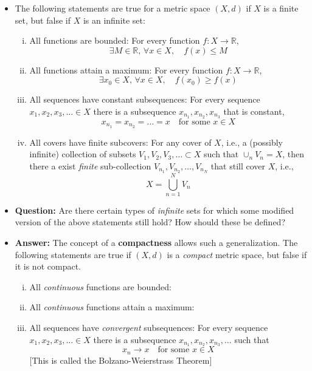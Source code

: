 \documentclass[11pt,twoside]{report}
\newcommand{\bbR}{{\mathbb{R}}}
\begin{document}
\begin{itemize}




\item The following statements are true for a metric space $(X,d)$ if $X$ is a finite set, but false if $X$ is an infinite set: 
\begin{enumerate}[(i)]
\item All functions are bounded: For every function $f \colon X \to \bbR$, 
\[
\exists M \in \bbR, \, \forall x \in X, \quad f(x) \le M
\]
\item All functions attain a maximum: For every function $f \colon X \to \bbR$, 
\[
\exists x_0 \in X, \, \forall x \in X, \quad f(x_0) \ge f(x) 
\]
\item All sequences have constant subsequences: For every sequence $x_1, x_2, x_3, \ldots \in X$ there is a subsequence $x_{n_1}, x_{n_2}, x_{n_3}$ that is constant, 
\[
x_{n_1} = x_{n_2} = \dots = x\quad \text{for some $x \in X$}
\]

\item All covers have finite subcovers: For any cover of $X$, i.e., a (possibly infinite) collection of subsets  $V_1, V_2 , V_3 , \ldots \subset X$ such that  $\cup_n V_n  = X$, then there  a exist  \emph{finite} sub-collection $V_{n_1}, V_{n_2}, \dots, V_{n_N}$ that still cover $X$, i.e., 
\[
X = \bigcup_{n = 1}^N V_n 
\]
\end{enumerate}

\item \textbf{Question:} Are there certain types of \emph{infinite} sets for which some modified version of the above statements still hold?  How should these be defined?


\item \textbf{Answer:}  The concept of a \textbf{compactness} allows such a generalization. The following statements are true if $(X,d)$ is a \emph{compact} metric space, but false if it is not compact.  
\begin{enumerate}[(i)]
\item All \emph{continuous} functions are bounded: 
\item All \emph{continuous} functions attain a maximum: 
\item All sequences have \emph{convergent}  subsequences: 
 For every sequence $x_1, x_2, x_3, \ldots \in X$ there is a subsequence $x_{n_1}, x_{n_2}, x_{n_3}, \ldots$ such that  
\[
x_n \to x \quad \text{for some $x \in X$}
\]
[This is called the Bolzano-Weierstrass Theorem] 


\end{enumerate}
\end{itemize}
\end{document}
